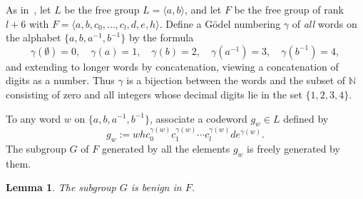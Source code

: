 \documentclass[12pt,a4paper]{article}
\newtheorem{lemma}[theorem]{Lemma}
\newcommand{\nn}{{\mathbb N}}
\begin{document}
As in~\cite[IV.7]{lynsch}, let $L$ be the free group $L=\langle a,b\rangle$, 
and let $F$ be the free group of rank $l+6$ with $F=\langle 
a,b,c_0, \ldots,c_l, d,e,h\rangle$.  Define a G\"odel numbering $\gamma$ 
of {\sl all} words on the alphabet $\{a,b,a^{-1},b^{-1}\}$ by the formula 
$$\gamma(\emptyset)=0, \quad
\gamma(a)=1, \quad
\gamma(b)=2, \quad
\gamma(a^{-1})=3, \quad
\gamma(b^{-1})=4,$$
and extending to longer words by concatenation, viewing a concatenation 
of digits as a number.  Thus $\gamma$ is a bijection between 
the words and the subset of $\nn$ consisting of zero and all integers whose
decimal digits lie in the set $\{1,2,3,4\}$.  

To any word $w$ on $\{a,b,a^{-1},b^{-1}\}$, associate a codeword $g_w\in L$ 
defined by 
$$g_w:= whc_0^{\gamma(w)}c_1^{\gamma(w)}\cdots c_l^{\gamma(w)}de^{\gamma(w)}.$$ 
The subgroup $G$ of $F$ generated by all the elements $g_w$ is freely 
generated by them.  

\begin{lemma}
The subgroup $G$ is benign in $F$.   
\end{lemma} 
\end{document}
